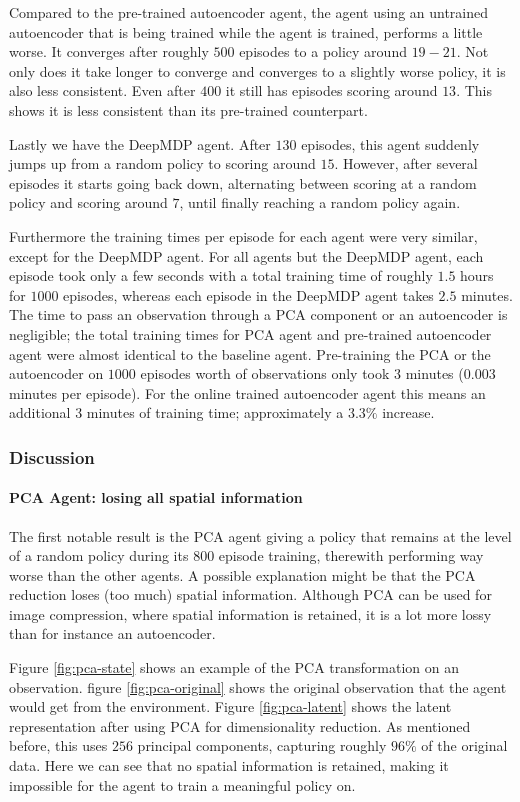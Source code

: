 Compared to the pre-trained autoencoder agent, the agent using an untrained autoencoder that is being trained while the agent is trained, performs a little worse. It converges after roughly $500$ episodes to a policy around $19-21$. Not only does it take longer to converge and converges to a slightly worse policy, it is also less consistent. Even after $400$ it still has episodes scoring around $13$. This shows it is less consistent than its pre-trained counterpart.

Lastly we have the DeepMDP agent. After $130$ episodes, this agent suddenly jumps up from a random policy to scoring around $15$. However, after several episodes it starts going back down, alternating between scoring at a random policy and scoring around $7$, until finally reaching a random policy again. 

Furthermore the training times per episode for each agent were very similar, except for the DeepMDP agent. For all agents but the DeepMDP agent, each episode took only a few seconds with a total training time of roughly $1.5$ hours for $1000$ episodes, whereas each episode in the DeepMDP agent takes $2.5$ minutes. The time to pass an observation through a PCA component or an autoencoder is negligible; the total training times for PCA agent and pre-trained autoencoder agent were almost identical to the baseline agent. Pre-training the PCA or the autoencoder on $1000$ episodes worth of observations only took $3$ minutes ($0.003$ minutes per episode). For the online trained autoencoder agent this means an additional $3$ minutes of training time; approximately a $3.3\%$ increase.

\subsubsection{Discussion}\label{research-discussion-pysc2}
\paragraph{PCA Agent: losing all spatial information}
The first notable result is the PCA agent giving a policy that remains at the level of a random policy during its $800$ episode training, therewith performing way worse than the other agents. A possible explanation might be that the PCA reduction loses (too much) spatial information. Although PCA can be used for image compression, where spatial information is retained, it is a lot more lossy than for instance an autoencoder.

Figure \ref{fig:pca-state} shows an example of the PCA transformation on an observation. figure \ref{fig:pca-original} shows the original observation that the agent would get from the environment. Figure \ref{fig:pca-latent} shows the latent representation after using PCA for dimensionality reduction. As mentioned before, this uses $256$ principal components, capturing roughly $96\%$ of the original data. Here we can see that no spatial information is retained, making it impossible for the agent to train a meaningful policy on. 

